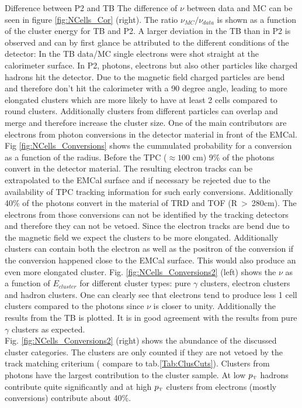 \documentclass[ALICE]{ALICE_analysis_notes}
\newcommand{\pT}{$p_{\mbox{\tiny T}}$\xspace}
\begin{document}
\begin{section}{Difference between P2 and TB}
The difference of $\nu$ between data and MC can be seen in figure \ref{fig:NCells_Cor} (right). The ratio $\nu_{MC}/\nu_{data}$ is shown as a function of the cluster energy for TB and P2. A larger deviation in the TB than in P2 is observed and can by first glance be attributed to the different conditions of the detector: In the TB data/MC single electrons were shot straight at the calorimeter surface. In P2, photons, electrons but also other particles like charged hadrons hit the detector. Due to the magnetic field charged particles are bend and therefore don't hit the calorimeter with a 90 degree angle, leading to more elongated clusters which are more likely to have at least 2 cells compared to round clusters. Additionally clusters from different particles can overlap and merge and therefore increase the cluster size. One of the main contributors are electrons from photon conversions in the detector material in front of the EMCal. Fig \ref{fig:NCells_Conversions} shows the cummulated  probability for a conversion as a function of the radius. Before the TPC ($\approx 100$ cm) 9\% of the photons convert in the detector material. The resulting electron tracks can be extrapolated to the EMCal surface and if necessary be rejected due to the availability of TPC tracking information for such early conversions. Additionally 40\% of the photons convert in the material of TRD and TOF (R$~>~$280cm). The electrons from those conversions can not be identified by the tracking detectors and therefore they can not be vetoed. Since the electron tracks are bend due to the magnetic field we expect the clusters to be more elongated. Additionally clusters can contain both the electron as well as the positron of the conversion if the conversion happened close to the EMCal surface. This would also produce an even more elongated cluster. Fig. \ref{fig:NCells_Conversions2} (left) shows the $\nu$ as a function of $E_{cluster}$ for different cluster types: pure $\gamma$ clusters, electron clusters and hadron clusters. One can clearly see that electrons tend to produce less 1 cell clusters compared to the photons since $\nu$ is closer to unity. Additionally the results from the TB is plotted. It is in good agreement with the results from pure $\gamma$ clusters as expected.\\
Fig. \ref{fig:NCells_Conversions2} (right) shows the abundance of the discussed cluster categories. The clusters are only counted if they are not vetoed by the track matching criterium ( compare to tab.\ref{Tab:ClusCuts}).   Clusters from photons have the largest contribution to the cluster sample. At low \pT hadrons contribute quite significantly and at high \pT clusters from electrons (mostly conversions) contribute about 40\%.\\


\end{section}
\end{document}
